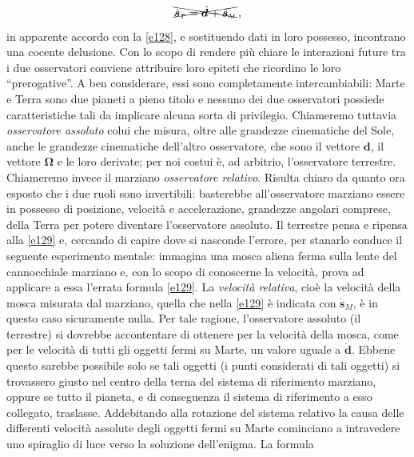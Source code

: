 \begin{equation}
\xcancel{\dot{\bm{s}}_{\scriptscriptstyle{T}}=
	\dot{\bm{d}}+
\dot{\bm{s}}_{\scriptscriptstyle{M}}}\,,
\label{e129}
\end{equation}
\noindent in apparente accordo con la \ref{e128}, e sostituendo dati in loro
possesso, incontrano una cocente delusione.
Con lo scopo di rendere pi\`u chiare le interazioni future tra i due osservatori
conviene attribuire loro epiteti che ricordino le loro ``prerogative''. A ben 
considerare, essi sono completamente intercambiabili: Marte e Terra sono
due pianeti a pieno titolo e nessuno dei due osservatori
possiede caratteristiche tali da
implicare alcuna sorta di privilegio. Chiameremo tuttavia
{\em osservatore assoluto} colui che
misura, oltre alle grandezze cinematiche del Sole,
anche le grandezze cinematiche dell'altro osservatore, che sono il
vettore $\bm d$, il vettore $\bm \Omega$ e le loro derivate; per noi costui \`e,
ad arbitrio, l'osservatore terrestre.
Chiameremo invece
il marziano {\em osservatore relativo}.
Risulta chiaro da quanto ora esposto che i due ruoli sono invertibili:
basterebbe all'osservatore marziano essere in possesso di posizione,
velocit\`a e accelerazione, grandezze angolari comprese, della
Terra per potere diventare 
l'osservatore assoluto.
\noindent Il terrestre pensa e ripensa alla \ref{e129} e, cercando di capire dove
si nasconde l'errore, per stanarlo conduce il seguente esperimento mentale: immagina una mosca
aliena ferma sulla lente del cannocchiale marziano e, con lo scopo
di conoscerne la velocit\`a, prova ad applicare a
essa l'errata 
formula \ref{e129}. La {\em velocit\`a relativa},
cio\`e la velocit\`a della mosca misurata dal marziano, quella che nella 
\ref{e129} \`e indicata con 
$\dot{\bm{s}}_{\scriptscriptstyle{M}}$,
 \`e in questo caso sicuramente nulla.
Per tale ragione, l'osservatore assoluto (il terrestre) si dovrebbe accontentare di ottenere
per la velocit\`a della mosca, come per le velocit\`a di tutti gli oggetti fermi
 su Marte, un valore uguale a
$\dot{\bm{d}}$. Ebbene questo sarebbe possibile solo se tali oggetti (i
punti considerati di tali oggetti) si trovassero giusto
nel centro della terna del sistema di riferimento marziano, oppure se tutto il pianeta,
e di conseguenza il sistema di riferimento a esso collegato, traslasse.
\noindent Addebitando alla rotazione del sistema relativo la causa delle differenti velocit\`a assolute
degli oggetti fermi su Marte cominciano a intravedere uno
spiraglio di luce verso la soluzione dell'enigma. La formula
